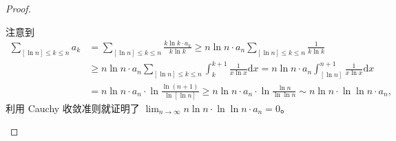 \documentclass[../../main.tex]{subfiles}%
\begin{document}
\begin{proof}
\begin{enumerate}
注意到
\begin{align*}
\sum_{[\ln n] \leqslant k \leqslant n} a_k &= \sum_{[\ln n] \leqslant k \leqslant n} \frac{k \ln k \cdot a_k}{k \ln k} \geqslant n \ln n \cdot a_n \sum_{[\ln n] \leqslant k \leqslant n} \frac{1}{k \ln k} \\
&\geqslant n \ln n \cdot a_n \sum_{[\ln n] \leqslant k \leqslant n} \int_{k}^{k + 1} \frac{1}{x \ln x} \mathrm{d}x = n \ln n \cdot a_n \int_{[\ln n]}^{n + 1} \frac{1}{x \ln x} \mathrm{d}x \\
&= n \ln n \cdot a_n \cdot \ln \frac{\ln (n + 1)}{\ln [\ln n]} \geqslant n \ln n \cdot a_n \cdot \ln \frac{\ln n}{\ln \ln n} \sim n \ln n \cdot \ln \ln n \cdot a_n,
\end{align*}
利用 Cauchy 收敛准则就证明了 \( \lim_{n \to \infty} n \ln n \cdot \ln \ln n \cdot a_n = 0 \)。
\end{enumerate}
\end{proof}
\end{document}
